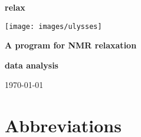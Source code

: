 \documentclass[a4paper, 11pt, twoside, openright]{book}
\begin{document}
\frontmatter



\begin{titlepage}
\begin{center}


{\Huge \textbf{relax}}

{\LARGE \textbf{}}

\centerline{\texttt{[image: images/ulysses]}}

{\huge \textbf{A program for NMR relaxation}}

{\huge \textbf{data analysis}}

{\large \today}

\end{center}
\end{titlepage}



\tableofcontents



\newpage
\listoffigures



\newpage
\listoftables



\chapter*{Abbreviations}
\end{document}
